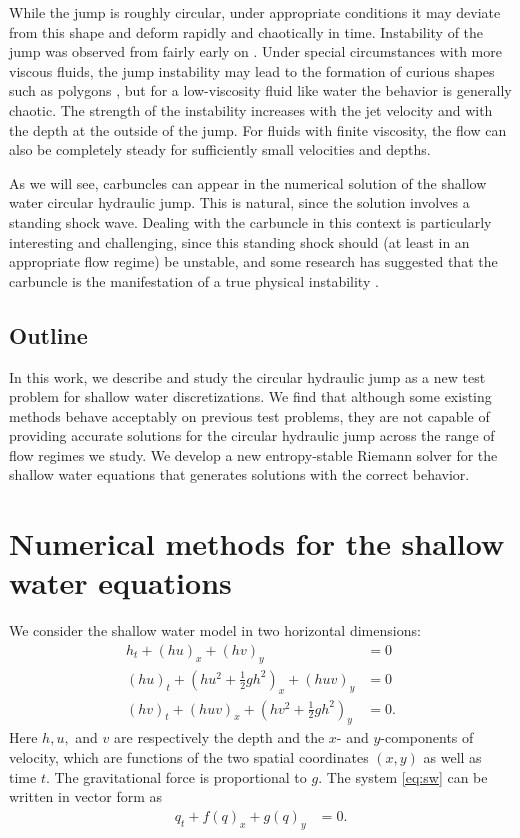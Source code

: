 \documentclass[preprint, 11pt]{article}
\begin{document}
While the jump is roughly circular, under appropriate conditions it may deviate
from this shape and deform rapidly and chaotically in time.
Instability of the jump was observed from fairly early on \cite{craik1981circular}.
Under special circumstances with more viscous fluids, the jump instability may lead to
the formation of curious shapes such as polygons \cite{ellegaard1998creating}, but
for a low-viscosity fluid like water the behavior is generally chaotic.
The strength of the instability increases with the jet velocity and with the
depth at the outside of the jump.  For fluids with finite viscosity, the flow
can also be completely steady for sufficiently small velocities and depths.


As we will see, carbuncles can appear in the numerical solution of the shallow
water circular hydraulic jump.  This is natural, since the solution involves a
standing shock wave.  Dealing with the carbuncle in this context is particularly
interesting and challenging, since this standing shock should (at least in an
appropriate flow regime) be unstable, and some research has suggested that the
carbuncle is the manifestation of a true physical
instability \cite{moschetta2001carbuncle,elling2009carbuncle}.


\subsection{Outline}
In this work, we describe and study the circular hydraulic jump as a new
test problem for shallow water discretizations.  We find that although some
existing methods behave acceptably on previous test problems, they
are not capable of providing accurate solutions for the circular hydraulic jump
across the range of flow regimes we study.  We develop a new entropy-stable
Riemann solver for the shallow water equations that generates solutions with
the correct behavior.


\section{Numerical methods for the shallow water equations}
We consider the shallow water model in two horizontal dimensions:
\begin{subequations} \label{eq:sw}
\begin{align}
    h_t + (hu)_x + (hv)_y & = 0 \\
    (hu)_t + \left(hu^2 + \frac{1}{2}gh^2\right)_x + (huv)_y & = 0 \\
    (hv)_t + (huv)_x + \left(hv^2 + \frac{1}{2}gh^2\right)_y & = 0.
\end{align}
\end{subequations}
Here $h, u,$ and $v$ are respectively the depth and the $x$- and $y$-components of
velocity, which are functions of the two spatial coordinates $(x,y)$ as well as time $t$.
The gravitational force is proportional to $g$.
The system \eqref{eq:sw} can be written in vector form as
\begin{align}
    q_t + f(q)_x + g(q)_y & = 0.
\end{align}
\end{document}
